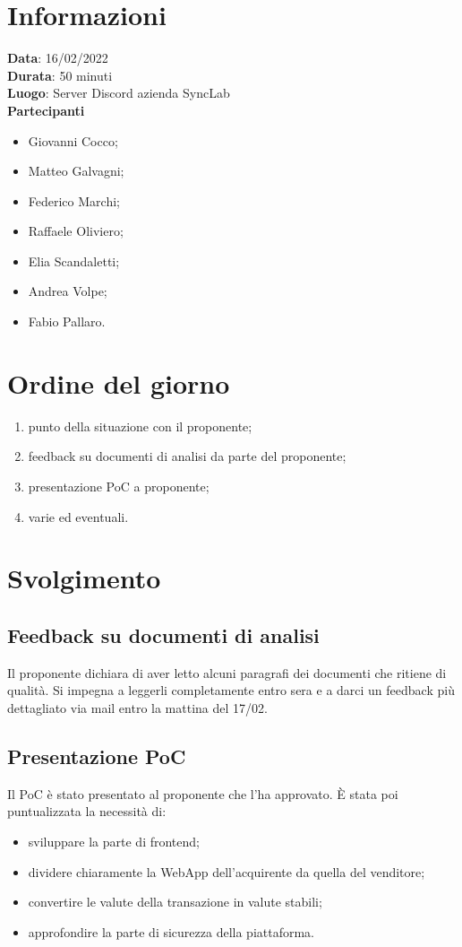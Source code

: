 \documentclass[a4paper, 12pt]{article}
\begin{document}
\makefrontpage

\section{Informazioni}
\textbf{Data}: 16/02/2022\\
\textbf{Durata}: 50 minuti\\
\textbf{Luogo}: Server Discord azienda SyncLab\\

\textbf{Partecipanti}
\begin{itemize}
	\item Giovanni Cocco;
	\item Matteo Galvagni;
	\item Federico Marchi;
	\item Raffaele Oliviero;
	\item Elia Scandaletti;
	\item Andrea Volpe;
	\item Fabio Pallaro.
\end{itemize}


\section{Ordine del giorno}
\begin{enumerate}
	\item punto della situazione con il proponente;
	\item feedback su documenti di analisi da parte del proponente;
	\item presentazione PoC a proponente;
	\item varie ed eventuali.
\end{enumerate}


\section{Svolgimento}
\subsection{Feedback su documenti di analisi}
Il proponente dichiara di aver letto alcuni paragrafi dei documenti che ritiene di qualità. Si impegna a leggerli completamente entro sera e a darci un feedback più dettagliato via mail entro la mattina del 17/02.

\subsection{Presentazione PoC}
Il PoC è stato presentato al proponente che l'ha approvato. È stata poi puntualizzata la necessità di:
\begin{itemize}
	\item sviluppare la parte di frontend;
	\item dividere chiaramente la WebApp dell'acquirente da quella del venditore;
	\item convertire le valute della transazione in valute stabili;
	\item approfondire la parte di sicurezza della piattaforma.
\end{itemize}
\end{document}
